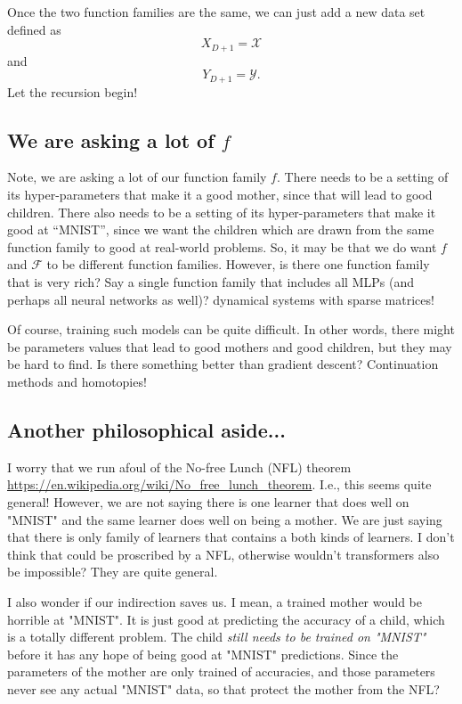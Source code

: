 \documentclass{article}
\begin{document}
Once the two function families are the same, we can just add a new data set defined as
$$
X_{D+1} = \mathcal{X}
$$
and
$$
Y_{D+1} = \mathcal{Y}.
$$
Let the recursion begin!

\subsection{We are asking a lot of $f$}
Note, we are asking a lot of our function family $f$.  There needs to be a setting of its hyper-parameters that make it a good mother, since that will lead to good children.  There also needs to be a setting of its hyper-parameters that make it good at ``MNIST'', since we want the children which are drawn from the same function family to good at real-world problems.  So, it may be that we do want $f$ and $\mathcal{F}$ to be different function families.  However, is there one function family that is very rich?  Say a single function family that includes all MLPs (and perhaps all neural networks as well)?  dynamical systems with sparse matrices!

Of course, training such models can be quite difficult.  In other words, there might be parameters values that lead to good mothers and good children, but they may be hard to find.  Is there something better than gradient descent?  Continuation methods and homotopies!

\subsection{Another philosophical aside...}
I worry that we run afoul of the No-free Lunch (NFL) theorem \url{https://en.wikipedia.org/wiki/No_free_lunch_theorem}. I.e., this seems quite general! However, we are not saying there is one learner that does well on "MNIST" and the same learner does well on being a mother.  We are just saying that there is only family of learners that contains a both kinds of learners.  I don't think that could be proscribed by a NFL, otherwise wouldn't transformers also be impossible?  They are quite general.

I also wonder if our indirection saves us.  I mean, a trained mother would be horrible at "MNIST".  It is just good at predicting the accuracy of a child, which is a totally different problem.  The child \emph{still needs to be trained on "MNIST"} before it has any hope of being good at "MNIST" predictions.  Since the parameters of the mother are only trained of accuracies, and those parameters never see any actual "MNIST" data, so that protect the mother from the NFL?
\end{document}
